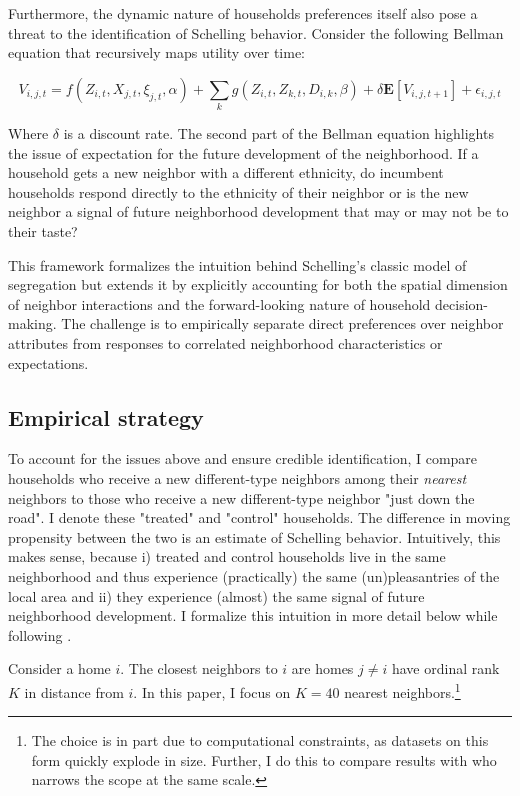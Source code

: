 \documentclass[../main.tex]{subfiles}
\begin{document}
Furthermore, the dynamic nature of households preferences itself also pose a threat to the identification of Schelling behavior. Consider the following Bellman equation that recursively maps utility over time:

\begin{equation}
    V_{i, j,t} = f(Z_{i,t}, X_{j,t}, \xi_{j,t}, \alpha) + \sum_k g(Z_{i,t}, Z_{k,t}, D_{i,k}, \beta) + \delta \mathbf{E}[V_{i,j,t+1}]+\epsilon_{i,j,t}
\end{equation}

Where $\delta$ is a discount rate. The second part of the Bellman equation highlights the issue of expectation for the future development of the neighborhood. If a household gets a new neighbor with a different ethnicity, do incumbent households respond directly to the ethnicity of their neighbor or is the new neighbor a signal of future neighborhood development that may or may not be to their taste?

This framework formalizes the intuition behind Schelling's classic model of segregation \textcite{schelling1971dynamic} but extends it by explicitly accounting for both the spatial dimension of neighbor interactions and the forward-looking nature of household decision-making. The challenge is to empirically separate direct preferences over neighbor attributes from responses to correlated neighborhood characteristics or expectations.

\subsection{Empirical strategy}
To account for the issues above and ensure credible identification, I compare households who receive a new different-type neighbors among their \textit{nearest} neighbors to those who receive a new different-type neighbor "just down the road". I denote these "treated" and "control" households. The difference in moving propensity between the two is an estimate of Schelling behavior. Intuitively, this makes sense, because i) treated and control households live in the same neighborhood and thus experience (practically) the same (un)pleasantries of the local area and ii) they experience (almost) the same signal of future neighborhood development. I formalize this intuition in more detail below while following \textcite{Bayer_2022_nearest_neighbor}.

Consider a home $i$. The closest neighbors to $i$ are homes $j\neq i$ have ordinal rank $K$ in distance from $i$. 
In this paper, I focus on $K=40$ nearest neighbors.\footnote{The choice is in part due to computational constraints, as datasets on this form quickly explode in size. Further, I do this to compare results with \textcite{Bayer_2022_nearest_neighbor} who narrows the scope at the same scale.}
\end{document}
